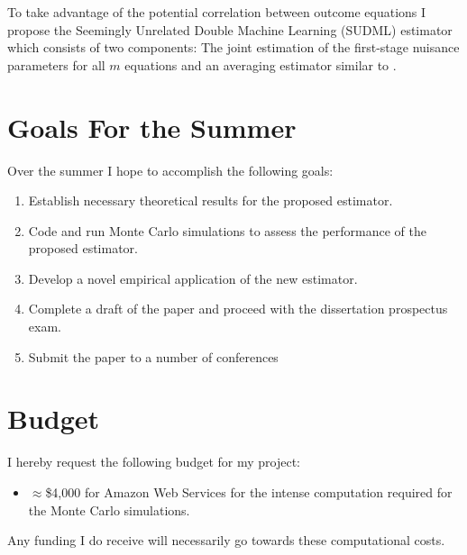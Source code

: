 \documentclass[12pt]{article}
\begin{document}
To take advantage of the potential correlation between outcome equations I propose the Seemingly Unrelated Double Machine Learning (SUDML) estimator which consists of two components: The joint estimation of the first-stage nuisance parameters for all $m$ equations and an averaging estimator similar to \cite{mehrabani2020improved}. 
 
\newpage
\section{Goals For the Summer}
Over the summer I hope to accomplish the following goals:
\begin{enumerate}
	\item Establish necessary theoretical results for the proposed estimator.
	\item Code and run Monte Carlo simulations to assess the performance of the proposed estimator.
	\item Develop a novel empirical application of the new estimator.
	\item Complete a draft of the paper and proceed with the dissertation prospectus exam. 
	\item Submit the paper to a number of conferences
\end{enumerate}
\section{Budget}
I hereby request the following budget for my project:
\begin{itemize}
	\item $\approx$\$4,000 for Amazon Web Services for the intense computation required for the Monte Carlo simulations.
\end{itemize}
Any funding I do receive will necessarily go towards these computational costs.




\newpage
\end{document}
